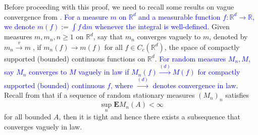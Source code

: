 \documentclass[12pt]{article}
\newtheorem{proposition}[theorem]{Proposition}
\newcommand{\R}{\mathbb{R}}
\newcommand{\Leb}{\mathcal{L}}
\newcommand{\tLeb}{\tilde{\mathcal{L}}}
\newcommand{\convlaw}{\stackrel{(d)}{\to}}
\newcommand{\1}{\mathbf{1}}
\newcommand{\md}{\mathrm{d}}
\newcommand{\REMOVE}[1]{}
\newcommand{\obsolete}[1]{\textcolor{gray}{{#1}}}
\newcommand{\RL}[1]{\textcolor{blue}{#1}}
\newcommand{\dy}[1]{\textcolor{blue}{#1}}
\newcommand{\obsolete}[1]{}%
\newcommand{\RL}[1]{#1}%
\newcommand{\dy}[1]{#1}%
\renewcommand{\footnote}[1]{}
\begin{document}
{{{{{\REMOVE{
\obsolete{
This result is an infinite version of the well known Birkhoff-von Neumann theorem (\cite[Exercise 40]{santambrogio2015optimal}), which states that the optimal transport cost for.
%
\begin{proposition}\label{prop:birkhoff}
Let $ n\geqslant  1$, $ \mu = \sum_{i = 1}^{{n}}\delta _{x_{i}} ,\nu  = \sum_{i =  1}^{n}\delta _{y_{i}}$, where the $ x_{i},y_{i}$ are {distinct} points of $ \mathbb{R}^{d}$, and let $ w$ a non-decreasing cost function. Then the optimal coupling $ M$ is realised by a transport map.
\end{proposition}
%
The first part  of the proof of Proposition \ref{p:matching_limit} is a weak compactness argument, the second part proceeds by approximating $\tLeb_{n}$ by a re-scaled and re-normalized lattice. We exploit a recent result of  \cite{erbar2023optimal} for the second step, an explicit construction appears in a previous version of this work on arXiv.}}

Before proceeding with this proof, we need to recall some results on vague convergence from \cite[Section 11]{DvJ08}. \dy{For a measure $m$ on $\R^d$ and a measurable function $f : \R^d \to \R$, we denote $m(f) := \int f \, \md m$ whenever the integral is well-defined.} Given measures  $ m,m_{n},n\geqslant  1$ on $ \mathbb{R}^{d}$, say that $ m_{n}$ converges vaguely to $ m$, denoted by $ m_{n} \xrightarrow[]{v}m\;$, if $ m_{n}(f)\to m(f)$ for all  $f \in C_c(\R^d)$, the space of compactly supported (bounded) continuous functions on $ \mathbb{R}^{d}$.  \dy{For random measures $ M_{ n},M$, say $ M_{ n}$ converges to $ M$ vaguely in law if $M_{ n}(f) \convlaw M(f)$ for compactly supported (bounded) continuous $f$, where $\convlaw$ denotes convergence in law.} Recall from   \cite[Proposition 11.1.VI]{DvJ08}  that if a sequence of random stationary measures $ (M_{n})_{ n}$ satisfies
\begin{equation}
\label{e:tight_vague}
\sup_{n}\mathbf{E}M_{n}(A) < \infty
\end{equation}
for all  bounded $A$, then it is tight and hence there exists a subsequence that converges vaguely {in law}.  

%

}}}}}
\end{document}
